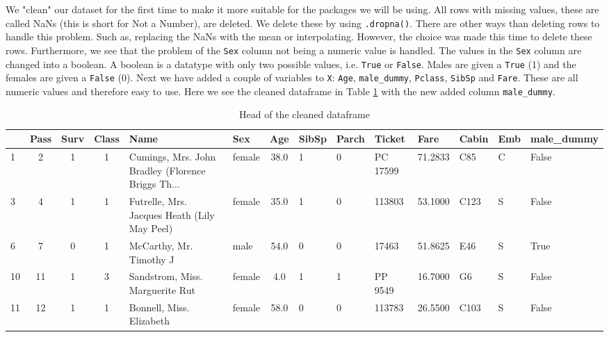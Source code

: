 \documentclass[11pt]{article}
\begin{document}
We "clean" our dataset for the first time to make it more suitable for
the packages we will be using. All rows with missing values, these are called
NaNs (this is short for Not a Number), are deleted. We delete these by using
\texttt{.dropna()}. There are other ways than deleting rows to handle this problem.
Such as, replacing the NaNs with the mean or interpolating. However, the
choice was made this time to delete these rows. Furthermore, we see that the
problem of the \texttt{Sex} column not being a numeric value is handled. The values
in the \texttt{Sex} column are changed into a boolean. A boolean is a datatype with
only two possible values, i.e. \texttt{True} or \texttt{False}. Males are given a \texttt{True} (1) and
the females are given a \texttt{False} (0). Next we have added a couple of variables
to \texttt{X}: \texttt{Age}, \texttt{male\_dummy}, \texttt{Pclass}, \texttt{SibSp} and \texttt{Fare}. These are all numeric
values and therefore easy to use.
Here we see the cleaned dataframe in Table \ref{tab:tabledfcleaned} with the new added column \texttt{male\_dummy}. 
\begin{table}
\small
\begin{center}
\caption{\label{tab:tabledfcleaned}Head of the cleaned dataframe}
\begin{adjustwidth}{-2cm}{}
\begin{tabular}{|l|c|c|c|p{3cm}|l|c|p{1cm}|p{1cm}|p{1cm}|p{1cm}|l|l|p{1cm}|}
\toprule
\hline
{} &  Pass &  Surv &  Class &                                               Name &     Sex &   Age &  SibSp &  Parch &    Ticket &     Fare & Cabin & Emb &  male\_dummy \\
\midrule
\hline
1  &            2 &         1 &       1 &  Cumings, Mrs. John Bradley (Florence Briggs Th... &  female &  38.0 &      1 &      0 &  PC 17599 &  71.2833 &   C85 &        C &       False \\
3  &            4 &         1 &       1 &       Futrelle, Mrs. Jacques Heath (Lily May Peel) &  female &  35.0 &      1 &      0 &    113803 &  53.1000 &  C123 &        S &       False \\
6  &            7 &         0 &       1 &                            McCarthy, Mr. Timothy J &    male &  54.0 &      0 &      0 &     17463 &  51.8625 &   E46 &        S &        True \\
10 &           11 &         1 &       3 &                    Sandstrom, Miss. Marguerite Rut &  female &   4.0 &      1 &      1 &   PP 9549 &  16.7000 &    G6 &        S &       False \\
11 &           12 &         1 &       1 &                           Bonnell, Miss. Elizabeth &  female &  58.0 &      0 &      0 &    113783 &  26.5500 &  C103 &        S &       False \\
\bottomrule
\hline
\end{tabular}
\end{adjustwidth}
\end{center}
\end{table}
\end{document}

